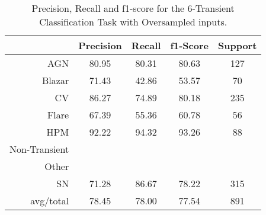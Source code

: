 \begin{table}
\centering
\begin{tabular}{|r|c|c|c|c|}
\hline
\multicolumn{1}{|l|}{} & Precision & Recall & f1-Score & Support \\ \hline \hline
AGN                    & 80.95              & 80.31             & 80.63             & 127             \\ \hline
Blazar                 & 71.43           & 42.86          & 53.57          & 70          \\ \hline
CV                     & 86.27               & 74.89              & 80.18              & 235              \\ \hline
Flare                  & 67.39            & 55.36           & 60.78           & 56           \\ \hline
HPM                    & 92.22              & 94.32             & 93.26             & 88             \\ \hline
Non-Transient          &     &    &    &    \\ \hline
Other                  &             &            &            &            \\ \hline
SN                     & 71.28               & 86.67              & 78.22              & 315              \\ \hline
avg/total              & 78.45            & 78.00           & 77.54           & 891           \\ \hline
\end{tabular}
\caption{Precision, Recall and f1-score for the 6-Transient Classification Task with Oversampled inputs.}
\label{Overall-Scores-6-Transient-Oversampled}
\end{table}
